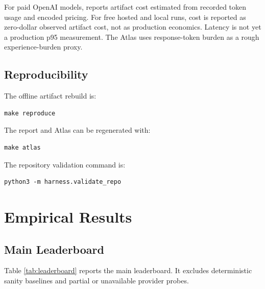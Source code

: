 \documentclass[11pt]{article}
\begin{document}
For paid OpenAI models, reports artifact cost estimated from recorded token usage and encoded pricing. For free hosted and local runs, cost is reported as zero-dollar observed artifact cost, not as production economics. Latency is not yet a production p95 measurement. The Atlas uses response-token burden as a rough experience-burden proxy.

\subsection{Reproducibility}

The offline artifact rebuild is:

\begin{verbatim}
make reproduce
\end{verbatim}

The report and Atlas can be regenerated with:

\begin{verbatim}
make atlas
\end{verbatim}

The repository validation command is:

\begin{verbatim}
python3 -m harness.validate_repo
\end{verbatim}

\section{Empirical Results}

\subsection{Main Leaderboard}

Table \ref{tab:leaderboard} reports the main leaderboard. It excludes deterministic sanity baselines and partial or unavailable provider probes.
\end{document}
